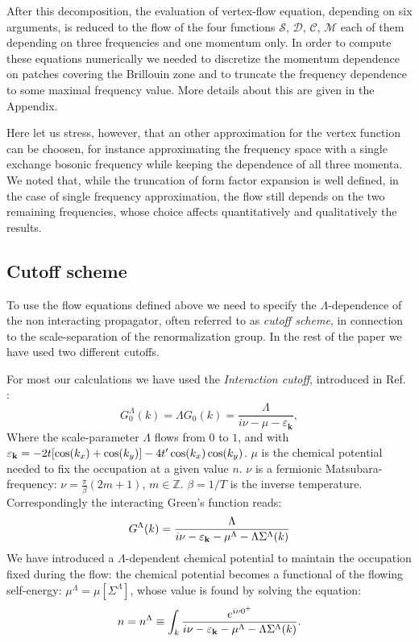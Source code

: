 After this decomposition, the evaluation of vertex-flow equation, depending on six arguments, is reduced to the flow of the four functions $\mathcal{S}$, $\mathcal{D}$, $\mathcal{C}$, $\mathcal{M}$ 
each of them depending on three frequencies and one momentum only. In order to compute these equations numerically we needed to discretize the momentum 
dependence on patches covering the Brillouin zone and to truncate the frequency dependence to some maximal frequency value. More details about this are given in the Appendix. 

Here let us stress, however, that an other approximation for the vertex function can be choosen, for instance approximating the frequency space with a single exchange bosonic frequency 
while keeping the dependence of all three momenta. We noted that, while the truncation of form factor expansion is well defined, in the case of single frequency approximation, the 
flow still depends on the two remaining frequencies, whose choice affects quantitatively and qualitatively the results.


\subsection{Cutoff scheme}
To use the flow equations defined above we need to specify the $\Lambda$-dependence of the non interacting propagator, often referred to as \textit{cutoff scheme}, in connection to the scale-separation of the renormalization group. 
In the rest of the paper we have used two different cutoffs. 
 
 For most our calculations we have used the \textit{Interaction cutoff}, introduced in Ref. : 
 \begin{equation}
 G_0^\Lambda(k) = \Lambda G_0(k)=\frac{\Lambda}{i\nu-\mu-\varepsilon_{\mathbf{k}} } , 
 \end{equation}
  Where the scale-parameter $\Lambda$ flows from $0$ to $1$, and  
 with $\varepsilon_{\mathbf{k}} = -2 t [\cos(k_x)+\cos(k_y)] - 4 t' \cos(k_x)\cos(k_y)$. $\mu$ is the chemical potential needed to fix the occupation at a given value $n$. $\nu$ is a fermionic Matsubara-frequency: $\nu = \frac{\pi}{\beta} (2m+1)$, $m\in \mathbb{Z}$. $\beta=1/T$ is the inverse temperature.       
Correspondingly the interacting Green's function reads: 
\begin{equation}
G^\Lambda (k) = \frac{\Lambda}{i\nu - \varepsilon_{\mathbf{k}} -\mu^\Lambda-\Lambda\Sigma^\Lambda(k)} 
\end{equation} 
We have introduced a $\Lambda$-dependent chemical potential to maintain the occupation fixed during the flow:  the chemical potential becomes a functional of the flowing self-energy: $\mu^\Lambda=\mu[\Sigma^\Lambda]$, whose value is found by solving the equation:  
\begin{equation}
n = n^{\Lambda} \equiv \int_k \frac{e^{i\nu 0^{+}}} {i\nu - \varepsilon_{\mathbf{k}} -\mu^\Lambda-\Lambda\Sigma^\Lambda(k)}. 
\end{equation}  

